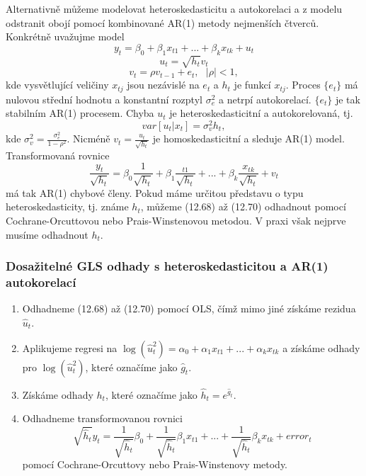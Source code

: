 Alternativně můžeme modelovat heteroskedasticitu a autokorelaci a z modelu odstranit obojí pomocí kombinované AR(1) metody nejmenších čtverců. Konkrétně uvažujme model
\begin{equation}
y_t = \beta_0 + \beta_1 x_{t1} + ... + \beta_k x_{tk} + u_t
\end{equation}
\begin{equation}
u_t = \sqrt{h_t}v_t
\end{equation}
\begin{equation}
v_t = \rho v_{t - 1} + e_t, ~~~ |\rho| < 1,
\end{equation}
kde vysvětlující veličiny $x_{tj}$ jsou nezávislé na $e_t$ a $h_t$ je funkcí $x_{tj}$. Proces $\{e_t\}$ má nulovou střední hodnotu a konstantní rozptyl $\sigma_e^2$ a netrpí autokorelací. $\{e_t\}$ je tak stabilním AR(1) procesem. Chyba $u_t$ je heteroskedasticitní a autokorelovaná, tj.
\begin{equation}
var[u_t|x_t] = \sigma^2_v h_t,
\end{equation}
kde $\sigma_v^2 = \frac{\sigma_e^2}{1 - \rho^2}$. Nicméně $v_t = \frac{u_t}{\sqrt{h_t}}$ je homoskedasticitní a sleduje AR(1) model. Transformovaná rovnice
\begin{equation}
\frac{y_t}{\sqrt{h_t}} = \beta_0\frac{1}{\sqrt{h_t}} + \beta_1 \frac{_{t1}}{\sqrt{h_t}} + ... + \beta_k \frac{x_{tk}}{\sqrt{h_t}} + v_t
\end{equation}
má tak AR(1) chybové členy. Pokud máme určitou představu o typu heteroskedasticity, tj. známe $h_t$, můžeme (12.68) až (12.70) odhadnout pomocí Cochrane-Orcuttovou nebo Prais-Winstenovou metodou. V praxi však nejprve musíme odhadnout $h_t$.

\subsubsection{Dosažitelné GLS odhady s heteroskedasticitou a AR(1) autokorelací}

\begin{enumerate}
\item Odhadneme (12.68) až (12.70) pomocí OLS, čímž mimo jiné získáme rezidua $\hat{u}_t$.
\item Aplikujeme regresi na $\log(\hat{u}^2_t) = \alpha_0 + \alpha_1 x_{t1} + ... + \alpha_k x_{tk}$ a získáme odhady pro $\log(\hat{u}^2_t)$, které označíme jako $\hat{g}_t$.
\item Získáme odhady $h_t$, které označíme jako $\hat{h}_t = e^{\hat{g}_t}$.
\item Odhadneme transformovanou rovnici
\begin{equation}
\sqrt{\hat{h}_t} y_t = \frac{1}{\sqrt{\hat{h}_t}} \beta_0 + \frac{1}{\sqrt{\hat{h}_t}} \beta_1 x_{t1} + ... + \frac{1}{\sqrt{\hat{h}_t}} \beta_k x_{tk} + error_t
\end{equation}
pomocí Cochrane-Orcuttovy nebo Prais-Winstenovy metody.
\end{enumerate}

